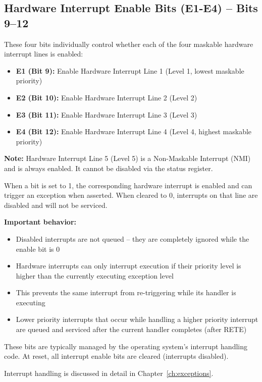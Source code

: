 \subsection{Hardware Interrupt Enable Bits (E1-E4) -- Bits 9--12}

These four bits individually control whether each of the four maskable hardware interrupt lines is enabled:

\begin{itemize}
	\item \textbf{E1 (Bit 9):} Enable Hardware Interrupt Line 1 (Level 1, lowest maskable priority)
	\item \textbf{E2 (Bit 10):} Enable Hardware Interrupt Line 2 (Level 2)
	\item \textbf{E3 (Bit 11):} Enable Hardware Interrupt Line 3 (Level 3)
	\item \textbf{E4 (Bit 12):} Enable Hardware Interrupt Line 4 (Level 4, highest maskable priority)
\end{itemize}

\textbf{Note:} Hardware Interrupt Line 5 (Level 5) is a Non-Maskable Interrupt (NMI) and is always enabled. It cannot
be disabled via the status register.

When a bit is set to 1, the corresponding hardware interrupt is enabled and can trigger an exception when asserted.
When cleared to 0, interrupts on that line are disabled and will not be serviced.

\textbf{Important behavior:}
\begin{itemize}
	\item Disabled interrupts are not queued -- they are completely ignored while the enable bit is 0
	\item Hardware interrupts can only interrupt execution if their priority level is higher than the currently executing
	      exception level
	\item This prevents the same interrupt from re-triggering while its handler is executing
	\item Lower priority interrupts that occur while handling a higher priority interrupt are queued and serviced after the
	      current handler completes (after RETE)
\end{itemize}

These bits are typically managed by the operating system's interrupt handling code. At reset, all interrupt enable bits
are cleared (interrupts disabled).

Interrupt handling is discussed in detail in Chapter~\ref{ch:exceptions}.

